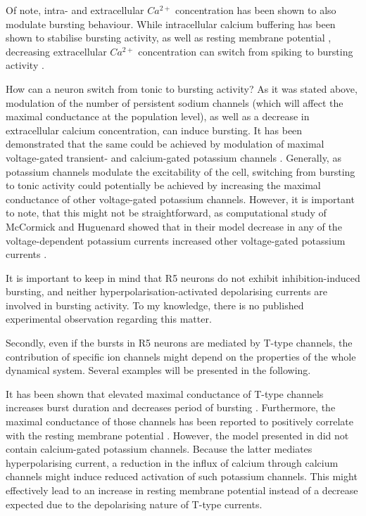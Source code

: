 \documentclass[../main.tex]{subfiles}
\begin{document}
Of note, intra- and extracellular $Ca^{2+}$ concentration has been shown to also modulate bursting behaviour. While intracellular calcium buffering has been shown to stabilise bursting activity, as well as resting membrane potential \cite{liuMultipleConductancesCooperatively2008}, decreasing extracellular $Ca^{2+}$ concentration can switch from spiking to bursting activity \cite{golombContributionPersistentNa2006}.

\vspace*{0.5cm}

How can a neuron switch from tonic to bursting activity? As it was stated above, modulation of the number of persistent sodium channels (which will affect the maximal conductance at the population level), as well as a decrease in extracellular calcium concentration, can induce bursting. It has been demonstrated that the same could be achieved by modulation of maximal voltage-gated transient- and calcium-gated potassium channels \cite{franciRobustTunableBursting2018}. Generally, as potassium channels modulate the excitability of the cell, switching from bursting to tonic activity could potentially be achieved by increasing the maximal conductance of other voltage-gated potassium channels. However, it is important to note,
that this might not be straightforward, as computational study of McCormick and Huguenard showed that in their model decrease in any of the voltage-dependent potassium currents increased other voltage-gated potassium currents \cite{mccormickModelElectrophysiologicalProperties1992}.

\vspace*{0.5cm}

It is important to keep in mind that R5 neurons do not exhibit inhibition-induced bursting, and neither hyperpolarisation-activated depolarising currents are involved in bursting activity. To my knowledge, there is no published experimental observation regarding this matter.

Secondly, even if the bursts in R5 neurons are mediated by T-type channels, the contribution of specific ion channels might depend on the properties of the whole dynamical system. Several examples will be presented in the following.

It has been shown that elevated maximal conductance of T-type channels increases burst duration and decreases period of bursting \cite{parkMathematicalModelSubthalamic2021}. Furthermore, the maximal conductance of those channels has been reported to positively correlate with the resting membrane potential \cite{amarilloInterplaySevenSubthreshold2014}. However, the model presented in \cite{amarilloInterplaySevenSubthreshold2014} did not contain calcium-gated potassium channels. Because the latter mediates hyperpolarising current, a reduction in the influx of calcium through calcium channels might induce reduced activation of such potassium channels. This might effectively lead to an increase in resting membrane potential instead of a decrease expected due to the depolarising nature of T-type currents.
\end{document}
